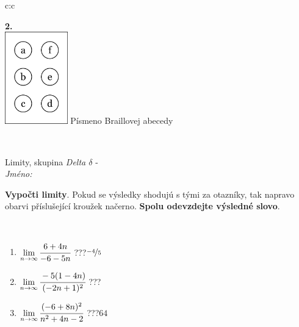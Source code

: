 \documentclass[10pt]{report}
\begin{document}
\begin{tabular}{c:c}
\begin{minipage}[c][104.5mm][t]{0.5\linewidth}
\begin{center}
\begin{minipage}{0.20\linewidth}
\begin{center}
{\Huge\bfseries 2.} \\[2mm]
\includegraphics[height=40mm]{../images/braille.png}
{\small Písmeno Braillovej abecedy}
\end{center}
\end{minipage}
\end{center}
\end{minipage}
\\ \hdashline
\begin{minipage}[c][104.5mm][t]{0.5\linewidth}
\begin{center}
\vspace{7mm}
{\huge Limity, skupina \textit{Delta $\delta$} -}\\[5mm]
\textit{Jméno:}\phantom{xxxxxxxxxxxxxxxxxxxxxxxxxxxxxxxxxxxxxxxxxxxxxxxxxxxxxxxxxxxxxxxxx}\\[5mm]
\begin{minipage}{0.95\linewidth}
\begin{center}
\textbf{Vypočti limity}. Pokud se výsledky shodujú s tými za otazníky, tak napravo\\obarvi příslušející kroužek načerno. \textbf{Spolu odevzdejte výsledné slovo}.
\end{center}
\end{minipage}
\\[1mm]
\begin{minipage}{0.79\linewidth}
\begin{center}
\begin{varwidth}{\linewidth}
\begin{enumerate}
\normalsize
\item $\lim\limits_{n\to\infty}\cfrac{6+4n}{-6-5n}$\quad \dotfill\; ???\;\dotfill \quad $\nicefrac{-4}{5}$
\item $\lim\limits_{n\to\infty}\cfrac{-5(1-4n)}{(-2n+1)^2}$\quad \dotfill\; ???\;\dotfill {}
\item $\lim\limits_{n\to\infty}\cfrac{(-6+8n)^2}{n^2+4n-2}$\quad \dotfill\; ???\;\dotfill \quad $64$

\end{enumerate}
\end{varwidth}
\end{center}
\end{minipage}
\end{center}
\end{minipage}
\end{tabular}
\end{document}

